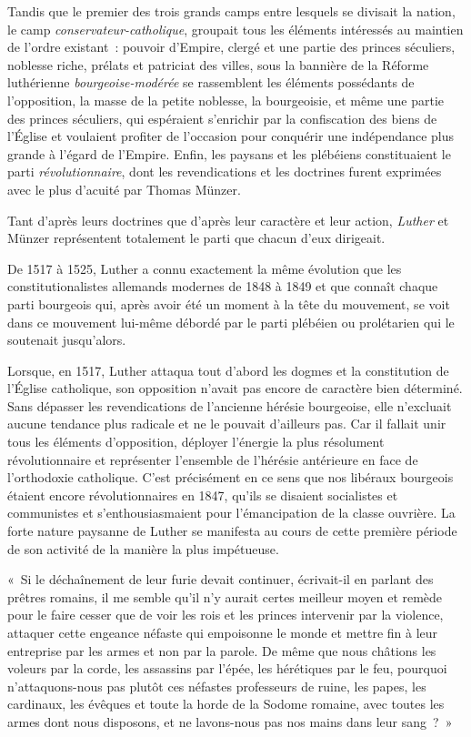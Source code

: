 \documentclass[french,twoside]{book} %
\newenvironment{quoteblock}%
  {\begin{quoting}}
  {\end{quoting}}
\newenvironment{quotebar}{%
    \def\FrameCommand{{\color{rubric!10!}\vrule width 0.5em} \hspace{0.9em}}%
    \def\OuterFrameSep{\itemsep} %
    \MakeFramed {\advance\hsize-\width \FrameRestore}
  }%
  {%
    \endMakeFramed
  }
\renewenvironment{quoteblock}%
  {%
    \savenotes
    \setstretch{0.9}
    \begin{quotebar}
  }
  {%
    \end{quotebar}
    \spewnotes
  }
\begin{document}
Tandis que le premier des trois grands camps entre lesquels se divisait la nation, le camp \emph{conservateur-catholique}, groupait tous les éléments intéressés au maintien de l’ordre existant : pouvoir d’Empire, clergé et une partie des princes séculiers, noblesse riche, prélats et patriciat des villes, sous la bannière de la Réforme luthérienne \emph{bourgeoise-modérée} se rassemblent les éléments possédants de l’opposition, la masse de la petite noblesse, la bourgeoisie, et même une partie des princes séculiers, qui espéraient s’enrichir par la confiscation des biens de l’Église et voulaient profiter de l’occasion pour conquérir une indépendance plus grande à l’égard de l’Empire. Enfin, les paysans et les plébéiens constituaient le parti \emph{révolutionnaire}, dont les revendications et les doctrines furent exprimées avec le plus d’acuité par Thomas Münzer.\par
Tant d’après leurs doctrines que d’après leur caractère et leur action, \emph{Luther} et Münzer représentent totalement le parti que chacun d’eux dirigeait.\par
De 1517 à 1525, Luther a connu exactement la même évolution que les constitutionalistes allemands modernes de 1848 à 1849 et que connaît chaque parti bourgeois qui, après avoir été un moment à la tête du mouvement, se voit dans ce mouvement lui-même débordé par le parti plébéien ou prolétarien qui le soutenait jusqu’alors.\par
Lorsque, en 1517, Luther attaqua tout d’abord les dogmes et la constitution de l’Église catholique, son opposition n’avait pas encore de caractère bien déterminé. Sans dépasser les revendications de l’ancienne hérésie bourgeoise, elle n’excluait aucune tendance plus radicale et ne le pouvait d’ailleurs pas. Car il fallait unir tous les éléments d’opposition, déployer l’énergie la plus résolument révolutionnaire et représenter l’ensemble de l’hérésie antérieure en face de l’orthodoxie catholique. C’est précisément en ce sens que nos libéraux bourgeois étaient encore révolutionnaires en 1847, qu’ils se disaient socialistes et communistes et s’enthousiasmaient pour l’émancipation de la classe ouvrière. La forte nature paysanne de Luther se manifesta au cours de cette première période de son activité de la manière la plus impétueuse.\par

\begin{quoteblock}
 \noindent « Si le déchaînement de leur furie devait continuer, écrivait-il en parlant des prêtres romains, il me semble qu’il n’y aurait certes meilleur moyen et remède pour le faire cesser que de voir les rois et les princes intervenir par la violence, attaquer cette engeance néfaste qui empoisonne le monde et mettre fin à leur entreprise par les armes et non par la parole. De même que nous châtions les voleurs par la corde, les assassins par l’épée, les hérétiques par le feu, pourquoi n’attaquons-nous pas plutôt ces néfastes professeurs de ruine, les papes, les cardinaux, les évêques et toute la horde de la Sodome romaine, avec toutes les armes dont nous disposons, et ne lavons-nous pas nos mains dans leur sang ? »
\end{quoteblock}
\end{document}
